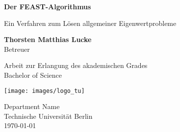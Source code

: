\begin{titlepage}
  \begin{center}
    \vspace*{1cm}

    \Huge
    \textbf{Der FEAST-Algorithmus}

    \vspace{0.5cm}
    \LARGE
    Ein Verfahren zum Lösen allgemeiner Eigenwertprobleme

    \vspace{1.5cm}

    \textbf{Thorsten Matthias Lucke}\\
    Betreuer

    \vfill

    Arbeit zur Erlangung des akademischen Grades\\
    Bachelor of Science

    \vspace{0.8cm}

    \texttt{[image: images/logo\_tu]}

    \Large
    Department Name\\
    Technische Universität Berlin\\
    \today

  \end{center}
\end{titlepage}
